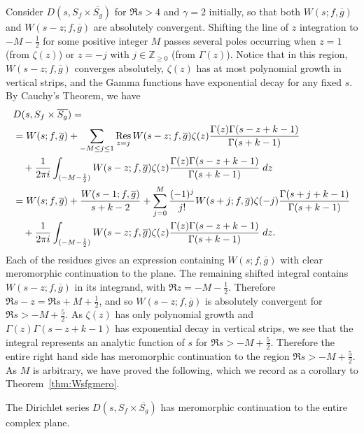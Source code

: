 Consider $D(s, S_f \times \overline{S_g})$ for $\Re s > 4$ and $\gamma = 2$ initially, so
that both $W(s; f, \overline{g})$ and $W(s-z; f, \overline{g})$ are absolutely convergent.
Shifting the line of $z$ integration to $-M - \frac{1}{2}$ for some positive integer $M$
passes several poles occurring when $z = 1$ (from $\zeta(z)$) or $z = -j$ with $j \in
\mathbb{Z}_{\geq 0}$ (from $\Gamma(z)$).
Notice that in this region, $W(s-z; f, \overline{g})$ converges absolutely, $\zeta(z)$ has
at most polynomial growth in vertical strips, and the Gamma functions have exponential
decay for any fixed $s$.
By Cauchy's Theorem, we have
\begin{align}
  &D(s, S_f \times \overline{S_g}) =\\
  &= W(s; f, \overline{g}) + \sum_{-M \leq j \leq 1} \operatorname*{Res}_{z = j} W(s-z; f, \overline{g})
  \zeta(z)\frac{\Gamma(z) \Gamma(s - z + k - 1)}{\Gamma(s + k - 1)} \\
  &\quad + \frac{1}{2\pi i} \int_{(-M - \frac{1}{2})} W(s-z; f, \overline{g})
  \zeta(z)\frac{\Gamma(z) \Gamma(s - z + k - 1)}{\Gamma(s + k - 1)} \; dz \\
  &= W(s; f, \overline{g}) + \frac{W(s-1; f, \overline{g})}{s+k-2} + \sum_{j = 0}^{M}
  \frac{(-1)^j}{j!} W(s + j; f, \overline{g}) \zeta(-j) \frac{\Gamma(s + j + k -
  1)}{\Gamma(s + k - 1)} \\
  &\quad + \frac{1}{2\pi i} \int_{(-M - \frac{1}{2})} W(s-z; f, \overline{g})
  \zeta(z)\frac{\Gamma(z) \Gamma(s - z + k - 1)}{\Gamma(s + k - 1)} \; dz.
\end{align}
Each of the residues gives an expression containing $W(s; f, \overline{g})$ with clear
meromorphic continuation to the plane.
The remaining shifted integral contains $W(s-z; f, \overline{g})$ in its integrand, with
$\Re z = -M-\tfrac{1}{2}$.
Therefore $\Re s-z = \Re s + M + \tfrac{1}{2}$, and so $W(s-z; f, \overline{g})$ is
absolutely convergent for $\Re s > -M + \tfrac{5}{2}$.
As $\zeta(z)$ has only polynomial growth and $\Gamma(z)\Gamma(s-z+k-1)$ has exponential
decay in vertical strips, we see that the integral represents an analytic function of $s$
for $\Re s > -M + \tfrac{5}{2}$.
Therefore the entire right hand side has meromorphic continuation to the region $\Re s >
-M + \tfrac{5}{2}$.
As $M$ is arbitrary, we have proved the following, which we record as a corollary to
Theorem~\ref{thm:Wsfgmero}.


\begin{corollary}\label{cor:DsSfSg_has_meromorphic}
  The Dirichlet series $D(s, S_f \times \overline{S_g})$ has meromorphic continuation to
  the entire complex plane.
\end{corollary}


